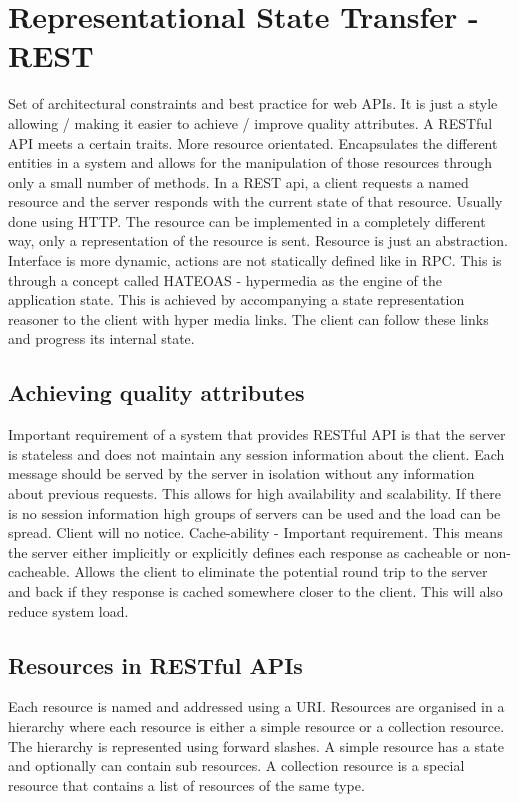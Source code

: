\documentclass[a4paper, 11pt]{book}
\begin{document}
    \section{Representational State Transfer - REST}
    Set of architectural constraints and best practice for web APIs. It is just a style allowing / making it easier to achieve / improve quality attributes.
    A RESTful API meets a certain traits.
    More resource orientated.
    Encapsulates the different entities in a system and allows for the manipulation of those resources through only a small number of methods.
    In a REST api, a client requests a named resource and the server responds with the current state of that resource.
    Usually done using HTTP. The resource can be implemented in a completely different way, only a representation of the resource is sent.
    Resource is just an abstraction.
    Interface is more dynamic, actions are not statically defined like in RPC.
    This is through a concept called HATEOAS - hypermedia as the engine of the application state.
    This is achieved by accompanying a state representation reasoner to the client with hyper media links.
    The client can follow these links and progress its internal state.

    \subsection{Achieving quality attributes}
    Important requirement of a system that provides RESTful API is that the server is stateless and does not maintain any session information about the client.
    Each message should be served by the server in isolation without any information about previous requests.
    This allows for high availability and scalability.
    If there is no session information high groups of servers can be used and the load can be spread. Client will no notice.
    Cache-ability - Important requirement.
    This means the server either implicitly or explicitly defines each response as cacheable or non-cacheable.
    Allows the client to eliminate the potential round trip to the server and back if they response is cached somewhere closer to the client.
    This will also reduce system load.

    \subsection{Resources in RESTful APIs}
    Each resource is named and addressed using a URI.
    Resources are organised in a hierarchy where each resource is either a simple resource or a collection resource.
    The hierarchy is represented using forward slashes.
    A simple resource has a state and optionally can contain sub resources.
    A collection resource is a special resource that contains a list of resources of the same type.
\end{document}
